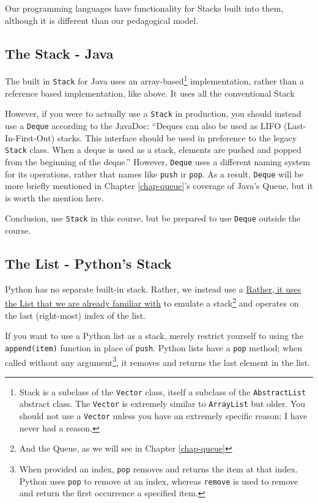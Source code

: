 Our programming languages have functionality for Stacks built into them, although it is different than our pedagogical model.
\subsection{The Stack - Java}
The built in \texttt{Stack} for Java uses an array-based\footnote{Stack is a subclass of the \texttt{Vector} class, itself a subclass of the \texttt{AbstractList} abstract class.  The \texttt{Vector} is extremely similar to \texttt{ArrayList} but older.  You should not use a \texttt{Vector} unless you have an extremely specific reason;  I have never had a reason.} implementation, rather than a reference based implementation, like above.  It uses all the conventional Stack

However, if you were to actually use a \texttt{Stack} in production, you should instead use a \texttt{Deque} according to the JavaDoc:
``Deques can also be used as LIFO (Last-In-First-Out) stacks. This interface should be used in preference to the legacy \texttt{Stack} class. When a deque is used as a stack, elements are pushed and popped from the beginning of the deque.'' 
However, \texttt{Deque} uses a different naming system for its operations, rather that names like \texttt{push} ir \texttt{pop}.  As a result, \texttt{Deque} will be more briefly mentioned in Chapter \ref{chap-queue}'s coverage of Java's Queue, but it is worth the mention here. 
 
Conclusion, use \texttt{Stack} in this course, but be prepared to use \texttt{Deque} outside the course.


\subsection{The List - Python's Stack}
Python has no separate built-in stack. Rather, we instead use a  \href{https://docs.python.org/3/tutorial/datastructures.html#using-lists-as-stacks} {Rather, it uses the List that we are already familiar with} to emulate a stack\footnote{And the Queue, as we will see in Chapter \ref{chap-queue}} and operates on the last (right-most) index of the list.

If you want to use a Python list as a stack, merely restrict yourself to using the \texttt{append(item)} function in place of \texttt{push}.
Python lists have a \texttt{pop} method;  when called without any argument\footnote{When provided an index, \texttt{pop} removes and returns the item at that index.  
Python uses \texttt{pop} to remove at an index, whereas \texttt{remove} is used to remove and return the first occurrence a specified item.},  it removes and returns the last element in the list.

